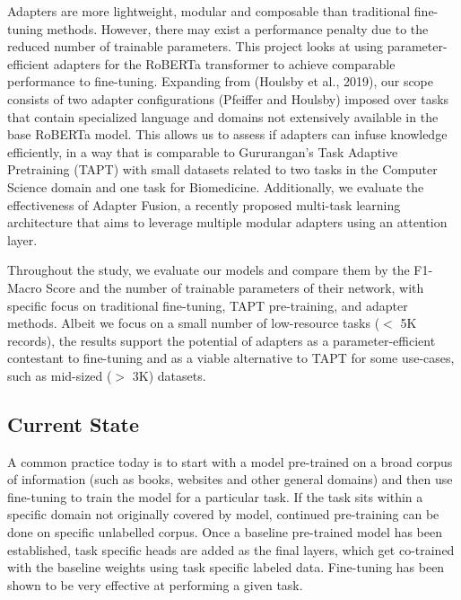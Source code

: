 \documentclass[10pt,twocolumn,letterpaper]{article}
\begin{document}
Adapters are more lightweight, modular and composable than traditional fine-tuning methods. However, there may exist a performance penalty due to the reduced number of trainable parameters. This project looks at using parameter-efficient adapters for the RoBERTa transformer to achieve comparable performance to fine-tuning. Expanding from (Houlsby et al., 2019), our scope consists of two adapter configurations (Pfeiffer and Houlsby) imposed over tasks that contain specialized language and domains not extensively available in the base RoBERTa model. This allows us to assess if adapters can infuse knowledge efficiently, in a way that is comparable to Gururangan’s Task Adaptive Pretraining (TAPT) with small datasets related to two tasks in the Computer Science domain and one task for Biomedicine. Additionally, we evaluate the effectiveness of Adapter Fusion, a recently proposed multi-task learning architecture that aims to leverage multiple modular adapters using an attention layer. 

Throughout the study, we evaluate our models and compare them by the F1-Macro Score and the number of trainable parameters of their network, with specific focus on traditional fine-tuning, TAPT pre-training, and adapter methods. Albeit we focus on a small number of low-resource tasks ($<$ 5K records), the results support the potential of adapters as a parameter-efficient contestant to fine-tuning and as a viable alternative to TAPT for some use-cases, such as mid-sized ($>$ 3K) datasets.

\subsection{Current State} A common practice today is to start with a model pre-trained on a broad corpus of information (such as books, websites and other general domains) and then use fine-tuning to train the model for a particular task. If the task sits within a specific domain not originally covered by model, continued  pre-training can be done on specific unlabelled corpus. Once a baseline pre-trained model has been established, task specific heads are added as the final layers, which get co-trained with the baseline weights using task specific labeled data. Fine-tuning has been shown to be very effective at performing a given task.
\end{document}
